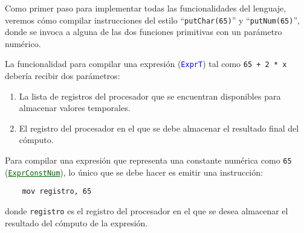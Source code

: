 \documentclass{article}
\renewcommand{\ast}[1]{\textcolor{darkgreen}{\texttt{\underline{#1}}}}
\newcommand{\type}[1]{\textcolor{blue}{\texttt{#1}}}
\begin{document}
Como primer paso para implementar todas las
funcionalidades del lenguaje, veremos
c\'omo compilar instrucciones del estilo
``\texttt{putChar(65)}'' y ``\texttt{putNum(65)}'',
donde se invoca a alguna de las dos funciones
primitivas con un par\'ametro num\'erico.

La funcionalidad para compilar una expresi\'on
(\type{ExprT})
tal como \texttt{65 + 2 * x}
deber\'ia recibir dos par\'ametros:
\begin{enumerate}
\item
  La lista de registros del procesador que
  se encuentran disponibles
  para almacenar valores temporales.
\item
  El registro del procesador en el que se debe
  almacenar el resultado final del c\'omputo.
\end{enumerate}
Para compilar una expresi\'on que representa una
constante num\'erica como \texttt{65} (\ast{ExprConstNum}),
lo \'unico que se debe hacer es emitir una
instrucci\'on:
\begin{lstlisting}
    mov registro, 65
\end{lstlisting}
donde \texttt{registro} es el registro del procesador
en el que se desea almacenar el resultado del c\'omputo
de la expresi\'on.
\end{document}
